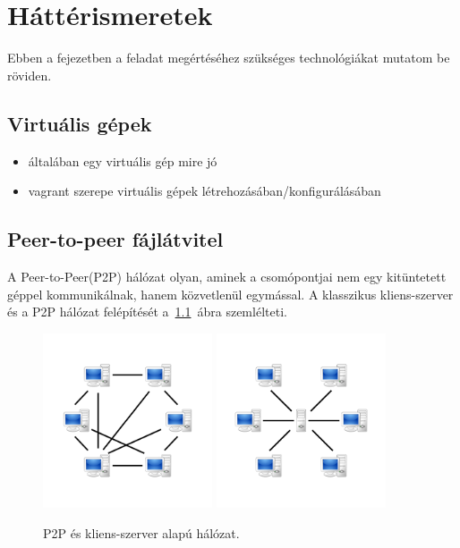 \chapter{Háttérismeretek}
\label{chp:background}
Ebben a fejezetben a feladat megértéséhez szükséges technológiákat mutatom be röviden.

\section{Virtuális gépek}
\begin{itemize}
  \item általában egy virtuális gép mire jó
  \item	vagrant szerepe virtuális gépek létrehozásában/konfigurálásában
\end{itemize}

\section{Peer-to-peer fájlátvitel}
\label{sect:p2p}
A Peer-to-Peer(P2P) hálózat olyan, aminek a csomópontjai nem egy kitüntetett géppel 
kommunikálnak, hanem közvetlenül egymással. A klasszikus kliens-szerver és a P2P hálózat felépítését
a~\ref{fig:networkcomparison}~ábra szemlélteti.

\begin{figure}[ht]
	\centering
	\includegraphics[width=50mm, keepaspectratio]{figures/P2P-network.png}\hspace{1cm}
	\includegraphics[width=50mm, keepaspectratio]{figures/Server-based-network.png}
	\caption{P2P és kliens-szerver alapú hálózat.}%
	\label{fig:networkcomparison}
\end{figure}

